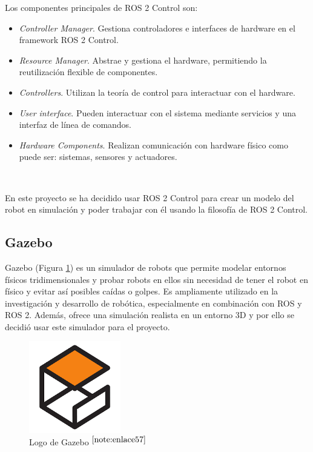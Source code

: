 Los componentes principales de \acs{ROS} 2 Control son:

\begin{itemize}
	\item\textit{Controller Manager}. Gestiona controladores e interfaces de hardware en el framework \acs{ROS} 2 Control.
	\item \textit{Resource Manager}. Abstrae y gestiona el hardware, permitiendo la reutilización flexible de componentes.
	\item \textit{Controllers}. Utilizan la teoría de control para interactuar con el hardware.
	\item \textit{User interface}. Pueden interactuar con el sistema mediante servicios y una interfaz de línea de comandos.
	\item \textit{Hardware Components}. Realizan comunicación con hardware físico como puede ser: sistemas, sensores y actuadores.
\end{itemize}\

En este proyecto se ha decidido usar \acs{ROS} 2 Control para crear un modelo del robot en simulación y poder trabajar con él usando la filosofía de \acs{ROS} 2 Control.


\subsection{Gazebo}

Gazebo (Figura \ref{fig:gazebo}) es un simulador de robots que permite modelar entornos físicos tridimensionales y probar robots en ellos sin necesidad de tener el robot en físico y evitar así posibles caídas o golpes. Es ampliamente utilizado en la investigación y desarrollo de robótica, especialmente en combinación con \acs{ROS} y \acs{ROS} 2. Además, ofrece una simulación realista en un entorno 3D y por ello se decidió usar este simulador para el proyecto.

\begin{figure} [h!]
	\begin{center}
		\includegraphics[width=4cm]{figs/gazebo.png}
	\end{center}
	\caption{Logo de Gazebo $^{\ref{note:enlace57}}$} 
	\label{fig:gazebo}
\end{figure}

